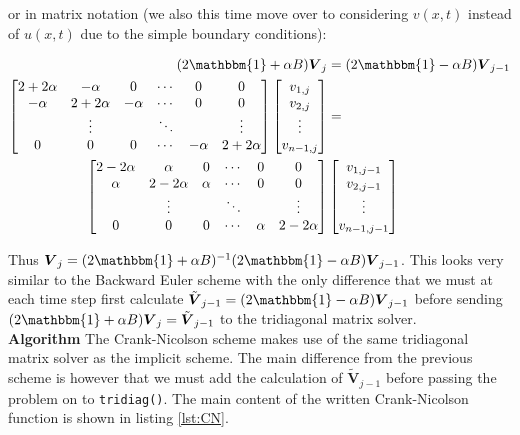 \documentclass[a4paper, 11pt, notitlepage,english]{article}
\newcommand{\id}{\mathbbm{1}}
\begin{document}
or in matrix notation (we also this time move over to considering $v(x,t)$ instead of $u(x,t)$ due to the simple boundary conditions):

\begin{align}
(2\id + \alpha B) \boldsymbol{V}_j &= (2\id - \alpha B) \boldsymbol{V}_{j-1} \\
\begin{bmatrix}
 2+2\alpha & -\alpha & 0 & \cdots & 0 & 0 \\
 -\alpha & 2+2\alpha & -\alpha & \cdots & 0 & 0 \\
  & \vdots & & \ddots & & \vdots \\
 0 & 0 & 0 & \cdots & -\alpha & 2+2\alpha \\
\end{bmatrix}
\begin{bmatrix}
v_{1,j} \\ v_{2,j} \\ \vdots \\ v_{n-1,j}
\end{bmatrix}
&= \\
\begin{bmatrix}
 2-2\alpha & \alpha & 0 & \cdots & 0 & 0 \\
 \alpha & 2-2\alpha & \alpha & \cdots & 0 & 0 \\
  & \vdots & & \ddots & & \vdots \\
 0 & 0 & 0 & \cdots & \alpha & 2-2\alpha \\
\end{bmatrix}
&\begin{bmatrix}
v_{1,j-1} \\ v_{2,j-1} \\ \vdots \\ v_{n-1,j-1}
\end{bmatrix}
\label{eq:Crank_Nicolson_matrix}
\end{align}

Thus $\boldsymbol{V}_j = (2\id+\alpha B)^{-1}(2\id - \alpha B)\boldsymbol{V}_{j-1}$. This looks very similar to the Backward Euler scheme with the only difference that we must at each time step first calculate $\tilde{\boldsymbol{V}}_{j-1} = (2\id - \alpha B)\boldsymbol{V}_{j-1}$ before sending $(2\id + \alpha B)\boldsymbol{V}_j = \tilde{\boldsymbol{V}}_{j-1}$ to the tridiagonal matrix solver. \\

\textbf{Algorithm} \newline
The Crank-Nicolson scheme makes use of the same tridiagonal matrix solver as the implicit scheme. The main difference from the previous scheme is however that we must add the calculation of $\tilde{\mathbf{V}}_{j-1}$ before passing the problem on to \texttt{tridiag()}. The main content of the written Crank-Nicolson function is shown in listing \ref{lst:CN}. 
\end{document}
